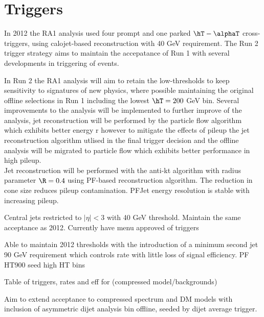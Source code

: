 \section{Triggers}
\label{sec:triggers}


In 2012 the RA1 analysis used four prompt and one parked $\hT-\alphaT$ cross-triggers, using calojet-based reconstruction with 40 GeV requirement. The Run 2 trigger strategy aims to maintain the accepatance of Run 1 with several developments in triggering of events.



In Run 2 the RA1 analysis will aim to retain the low-thresholds to keep sensitivity to signatures of new physics, where possible maintaining the original offline selections in Run 1 including the lowest $\hT = 200$ GeV bin. Several improvements to the analysis will be implemented to further improve of the analysis, jet reconstruction will be performed by the particle flow algorithm which exhibits better energy r however to mitigate the effects of pileup the jet reconstruction algorithm utlised in the final trigger decision and the offline analysis will be migrated to particle flow which exhibits better performance in high pileup.\\


Jet reconstruction will be performed with the anti-kt algorithm with radius parameter $\R = 0.4$ using PF-based reconstruction algorithm. The reduction in cone size reduces pileup contamination. PFJet energy resolution is stable with increasing pileup.


Central jets restricted to $|\eta| < 3$ with 40 GeV threshold.
Maintain the same acceptance as 2012.
Currently have menu approved of triggers

Able to maintain 2012 thresholds with the introduction of a minimum second jet 90 GeV requirement which controls rate with little loss of signal efficiency.
PF HT900 seed high HT bins

Table of triggers, rates and eff for (compressed model/backgrounds)

Aim to extend acceptance to compressed spectrum and DM models with inclusion of asymmetric dijet analysis bin offline, seeded by dijet average trigger.



